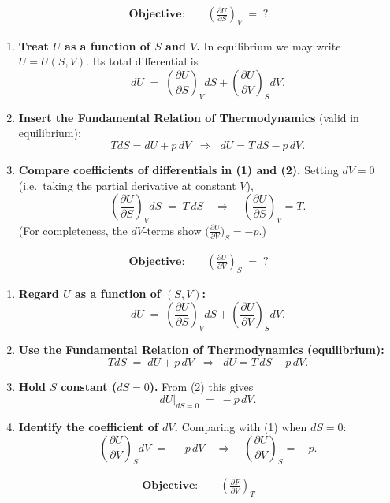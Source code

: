 \documentclass[12pt]{article}
\theoremstyle{definition} %
\theoremstyle{plain} %
\begin{document}
\begin{align*}
\textbf{Objective:}\qquad 
\left(\frac{\partial U}{\partial S}\right)_V \;=\; ?
\end{align*}

\begin{enumerate}
\item \textbf{Treat \(U\) as a function of \(S\) and \(V\).}  
      In equilibrium we may write \(U = U(S,V)\).  
      Its total differential is
      \[
          dU
          \;=\;
          \left(\frac{\partial U}{\partial S}\right)_V dS
          +\left(\frac{\partial U}{\partial V}\right)_S dV .
          \tag{1}
      \]

\item \textbf{Insert the Fundamental Relation of Thermodynamics}  
      (valid in equilibrium):
      \[
          TdS = dU + p\,dV
          \;\;\Longrightarrow\;\;
          dU = T\,dS - p\,dV .
          \tag{2}
      \]

\item \textbf{Compare coefficients of differentials in (1) and (2).}  
      Setting \(dV=0\) (i.e.\ taking the partial derivative at constant \(V\)),
      \[
          \left(\frac{\partial U}{\partial S}\right)_V dS \;=\; T\,dS
          \quad\Longrightarrow\quad
          \boxed{\displaystyle
          \left(\frac{\partial U}{\partial S}\right)_V = T }.
      \]
      (For completeness, the \(dV\)-terms show 
      \(\bigl(\frac{\partial U}{\partial V}\bigr)_S = -p\).)
\end{enumerate}
\begin{align*}
  \textbf{Objective:}\qquad 
  \left(\frac{\partial U}{\partial V}\right)_S \;=\; ?
  \end{align*}
  
  \begin{enumerate}
  \item \textbf{Regard \(U\) as a function of \((S,V)\):}
        \[
          dU
          \;=\;
          \left(\frac{\partial U}{\partial S}\right)_V dS
          +\left(\frac{\partial U}{\partial V}\right)_S dV .
          \tag{1}
        \]
  
  \item \textbf{Use the Fundamental Relation of Thermodynamics (equilibrium):}
        \[
          TdS \;=\; dU + p\,dV
          \;\;\Longrightarrow\;\;
          dU = T\,dS - p\,dV .
          \tag{2}
        \]
  
  \item \textbf{Hold \(S\) constant (\(dS=0\)).}  
        From (2) this gives
        \[
          dU\big|_{dS=0} \;=\; -p\,dV .
        \]
  
  \item \textbf{Identify the coefficient of \(dV\).}  
        Comparing with (1) when \(dS=0\):
        \[
          \left(\frac{\partial U}{\partial V}\right)_S dV \;=\; -p\,dV
          \quad\Longrightarrow\quad
          \boxed{\displaystyle
          \left(\frac{\partial U}{\partial V}\right)_S = -\,p }.
        \]
  \end{enumerate}
  \begin{align*}
    \textbf{Objective:}\qquad
    \left(\frac{\partial F}{\partial V}\right)_T
    \end{align*}
    
\end{document}
